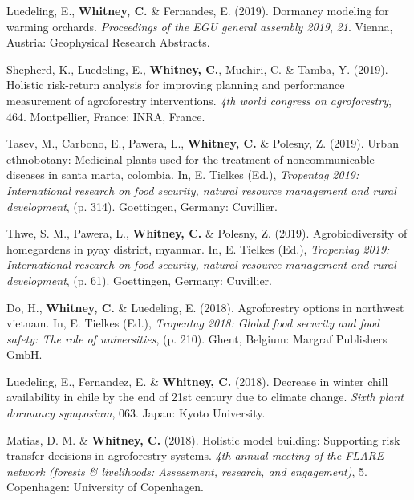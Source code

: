 \documentclass[11pt,a4paper,]{awesome-cv}
\newlength{\cslhangindent}
\newenvironment{CSLReferences}[2] %
 {\begin{list}{}{%
  \setlength{\itemindent}{0pt}
  \setlength{\leftmargin}{0pt}
  \setlength{\parsep}{0pt}
  \ifodd #1
   \setlength{\leftmargin}{\cslhangindent}
   \setlength{\itemindent}{-1\cslhangindent}
  \fi
  \setlength{\itemsep}{#2\baselineskip}}}
 {\end{list}}
\begin{document}
\begin{CSLReferences}{1}{0}
Luedeling, E., \textbf{Whitney, C.} \& Fernandes, E. (2019). Dormancy
modeling for warming orchards. \emph{Proceedings of the EGU general
assembly 2019}, \emph{21}. Vienna, Austria: Geophysical Research
Abstracts.

Shepherd, K., Luedeling, E., \textbf{Whitney, C.}, Muchiri, C. \& Tamba,
Y. (2019). Holistic risk-return analysis for improving planning and
performance measurement of agroforestry interventions. \emph{4th world
congress on agroforestry}, 464. Montpellier, France: INRA, France.

Tasev, M., Carbono, E., Pawera, L., \textbf{Whitney, C.} \& Polesny, Z.
(2019). Urban ethnobotany: Medicinal plants used for the treatment of
noncommunicable diseases in santa marta, colombia. In, E. Tielkes (Ed.),
\emph{Tropentag 2019: International research on food security, natural
resource management and rural development}, (p. 314). Goettingen,
Germany: Cuvillier.

Thwe, S. M., Pawera, L., \textbf{Whitney, C.} \& Polesny, Z. (2019).
Agrobiodiversity of homegardens in pyay district, myanmar. In, E.
Tielkes (Ed.), \emph{Tropentag 2019: International research on food
security, natural resource management and rural development}, (p. 61).
Goettingen, Germany: Cuvillier.

Do, H., \textbf{Whitney, C.} \& Luedeling, E. (2018). Agroforestry
options in northwest vietnam. In, E. Tielkes (Ed.), \emph{Tropentag
2018: Global food security and food safety: The role of universities},
(p. 210). Ghent, Belgium: Margraf Publishers GmbH.

Luedeling, E., Fernandez, E. \& \textbf{Whitney, C.} (2018). Decrease in
winter chill availability in chile by the end of 21st century due to
climate change. \emph{Sixth plant dormancy symposium}, 063. Japan: Kyoto
University.

Matias, D. M. \& \textbf{Whitney, C.} (2018). Holistic model building:
Supporting risk transfer decisions in agroforestry systems. \emph{4th
annual meeting of the FLARE network (forests \& livelihoods: Assessment,
research, and engagement)}, 5. Copenhagen: University of Copenhagen.


\end{CSLReferences}
\end{document}
